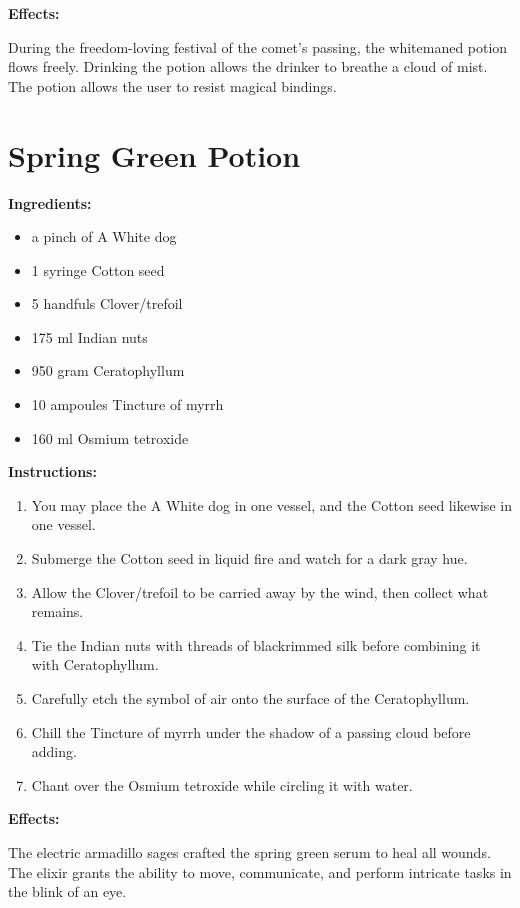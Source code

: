 \documentclass{article}
\begin{document}
\textbf{Effects:}

During the freedom-loving festival of the comet’s passing, the whitemaned potion flows freely. Drinking the potion allows the drinker to breathe a cloud of mist. The potion allows the user to resist magical bindings.

\newpage
\section*{Spring Green Potion}

\textbf{Ingredients:}

\begin{itemize}
  \item a pinch of A White dog
  \item 1 syringe Cotton seed
  \item 5 handfuls Clover/trefoil
  \item 175 ml Indian nuts
  \item 950 gram Ceratophyllum
  \item 10 ampoules Tincture of myrrh
  \item 160 ml Osmium tetroxide
\end{itemize}

\textbf{Instructions:}

\begin{enumerate}
  \item You may place the A White dog in one vessel, and the Cotton seed likewise in one vessel.
  \item Submerge the Cotton seed in liquid fire and watch for a dark gray hue.
  \item Allow the Clover/trefoil to be carried away by the wind, then collect what remains.
  \item Tie the Indian nuts with threads of blackrimmed silk before combining it with Ceratophyllum.
  \item Carefully etch the symbol of air onto the surface of the Ceratophyllum.
  \item Chill the Tincture of myrrh under the shadow of a passing cloud before adding.
  \item Chant over the Osmium tetroxide while circling it with water.
\end{enumerate}

\textbf{Effects:}

The electric armadillo sages crafted the spring green serum to heal all wounds. The elixir grants the ability to move, communicate, and perform intricate tasks in the blink of an eye.
\end{document}
